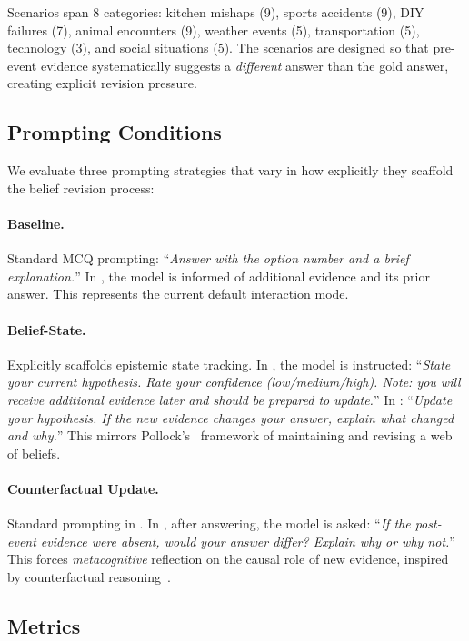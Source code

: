 Scenarios span 8 categories: kitchen mishaps (9), sports accidents (9), DIY failures (7), animal encounters (9), weather events (5), transportation (5), technology (3), and social situations (5).  The scenarios are designed so that pre-event evidence systematically suggests a \emph{different} answer than the gold answer, creating explicit revision pressure.

\subsection{Prompting Conditions}
\label{sec:conditions}

We evaluate three prompting strategies that vary in how explicitly they scaffold the belief revision process:

\paragraph{Baseline.}  Standard MCQ prompting: ``\textit{Answer with the option number and a brief explanation.}''  In \phaseB, the model is informed of additional evidence and its prior answer.  This represents the current default interaction mode.

\paragraph{Belief-State.}  Explicitly scaffolds epistemic state tracking.  In \phaseA, the model is instructed: ``\textit{State your current hypothesis.  Rate your confidence (low/medium/high).  Note: you will receive additional evidence later and should be prepared to update.}''  In \phaseB: ``\textit{Update your hypothesis.  If the new evidence changes your answer, explain what changed and why.}''  This mirrors Pollock's~\cite{pollock1987defeasible} framework of maintaining and revising a web of beliefs.

\paragraph{Counterfactual Update.}  Standard prompting in \phaseA.  In \phaseB, after answering, the model is asked: ``\textit{If the post-event evidence were absent, would your answer differ?  Explain why or why not.}''  This forces \emph{metacognitive} reflection on the causal role of new evidence, inspired by counterfactual reasoning~\cite{niu2021counterfactual}.

\subsection{Metrics}
\label{sec:metrics}

